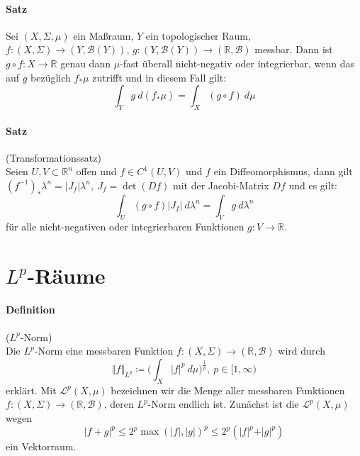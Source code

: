 \documentclass[12pt,a4paper,fleqn]{article}
\begin{document}
\paragraph{Satz} Sei $(X, \Sigma, \mu)$ ein Maßraum, $Y$ ein topologischer Raum, \mbox{$f\colon (X, \Sigma) \rightarrow (Y, \mathcal{B}(Y))$}, $g\colon (Y, \mathcal{B}(Y)) \rightarrow (\mathbb{R}, \mathcal{B})$ messbar. Dann ist $g \circ f\colon X \rightarrow \mathbb{R}$ genau dann $\mu$-fast überall nicht-negativ oder integrierbar, wenn das auf $g$ bezüglich $f _\ast \mu$ zutrifft und in diesem Fall gilt:
\begin{displaymath}
\int_Y g\ d(f_\ast \mu) = \int_X (g \circ f)\ d\mu 
\end{displaymath}

\paragraph{Satz} (Transformationssatz)\\
Seien $U, V \subset \mathbb{R}^n$ offen und $f \in C^1(U, V)$ und $f$ ein Diffeomorphismus, dann gilt $(f^{-1}) _\ast \lambda^n = \vert J_f \vert \lambda^n,\ J_f = \det(Df)$
 mit der Jacobi-Matrix $Df$ und es gilt:
\begin{displaymath}
\int_U (g \circ f)\vert J_f \vert\ d\lambda^n = \int_V g\ d\lambda^n
\end{displaymath}
für alle nicht-negativen oder integrierbaren Funktionen $g\colon V \rightarrow \mathbb{R}$.

\section{$L^p$-Räume}

\paragraph{Definition} ($L^p$-Norm)\\
Die $L^p$-Norm eine messbaren Funktion $f\colon (X, \Sigma) \rightarrow (\mathbb{R}, \mathcal{B})$ wird durch
\begin{displaymath}
\Vert f \Vert _{L^p} \coloneqq \bigg( \int_X \vert f \vert ^p\ d\mu \bigg)^{\frac{1}{p}},\ p \in [1, \infty)
\end{displaymath}
erklärt. Mit $\mathscr{L}^p(X, \mu)$ bezeichnen wir die Menge aller messbaren Funktionen\linebreak \mbox{$f\colon (X, \Sigma) \rightarrow (\mathbb{R}, \mathcal{B})$}, deren $L^p$-Norm endlich ist. Zunächst ist die $\mathscr{L}^p(X, \mu)$ wegen
\begin{displaymath}
\vert f + g \vert ^p \leq 2^p \max(\vert f \vert, \vert g \vert)^p \leq 2^p (\vert f \vert ^p + \vert g \vert ^p)
\end{displaymath}
ein Vektorraum.
\end{document}
